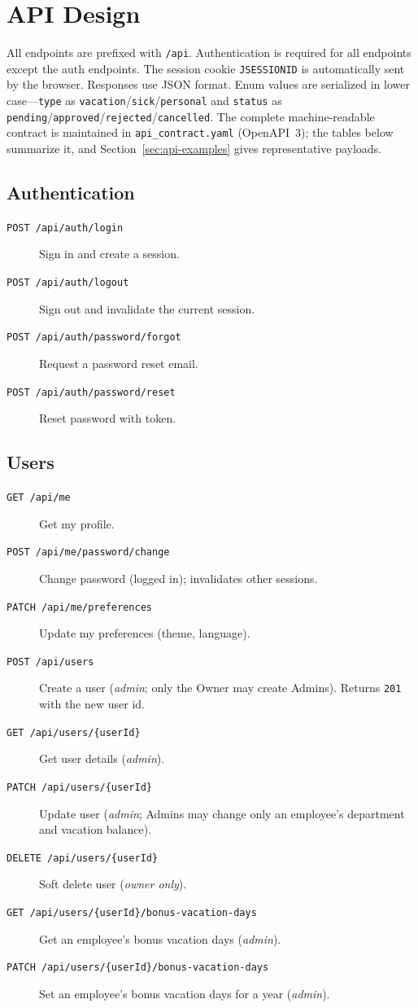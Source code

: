 \documentclass[11pt,a4paper]{article}
\begin{document}
\section{API Design}
\label{sec:api}

All endpoints are prefixed with \texttt{/api}. Authentication is required for all endpoints except the auth endpoints. The session cookie \texttt{JSESSIONID} is automatically sent by the browser. Responses use JSON format. Enum values are serialized in lower case---\texttt{type} as \texttt{vacation}/\texttt{sick}/\texttt{personal} and \texttt{status} as \texttt{pending}/\texttt{approved}/\texttt{rejected}/\texttt{cancelled}. The complete machine-readable contract is maintained in \texttt{api\_contract.yaml} (OpenAPI~3); the tables below summarize it, and Section~\ref{sec:api-examples} gives representative payloads.

\subsection{Authentication}
\begin{description}
    \item[\texttt{POST /api/auth/login}] Sign in and create a session.
    \item[\texttt{POST /api/auth/logout}] Sign out and invalidate the current session.
    \item[\texttt{POST /api/auth/password/forgot}] Request a password reset email.
    \item[\texttt{POST /api/auth/password/reset}] Reset password with token.
\end{description}

\subsection{Users}
\begin{description}
    \item[\texttt{GET /api/me}] Get my profile.
    \item[\texttt{POST /api/me/password/change}] Change password (logged in); invalidates other sessions.
    \item[\texttt{PATCH /api/me/preferences}] Update my preferences (theme, language).
    \item[\texttt{POST /api/users}] Create a user (\textit{admin}; only the Owner may create Admins). Returns \texttt{201} with the new user id.
    \item[\texttt{GET /api/users/\{userId\}}] Get user details (\textit{admin}).
    \item[\texttt{PATCH /api/users/\{userId\}}] Update user (\textit{admin}; Admins may change only an employee's department and vacation balance).
    \item[\texttt{DELETE /api/users/\{userId\}}] Soft delete user (\textit{owner only}).
    \item[\texttt{GET /api/users/\{userId\}/bonus-vacation-days}] Get an employee's bonus vacation days (\textit{admin}).
    \item[\texttt{PATCH /api/users/\{userId\}/bonus-vacation-days}] Set an employee's bonus vacation days for a year (\textit{admin}).
\end{description}
\end{document}

